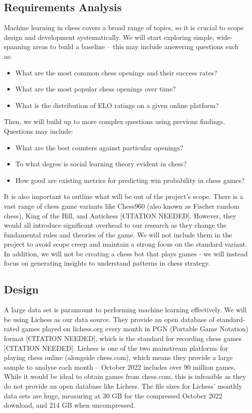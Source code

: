 \documentclass[%
 superscriptaddress,
showpacs,preprintnumbers,
 amsmath,
 amssymb,
 aps,
 pra,
showkeys,
onecolumn,
notitlepage,
11pt,
tightenlines      %
]{revtex4-1}
\begin{document}
\subsection{Requirements Analysis}
Machine learning in chess covers a broad range of topics, so it is crucial to scope design and development systematically. We will start exploring simple, wide-spanning areas to build a baseline – this may include answering questions such as:

\begin{itemize}
    \item What are the most common chess openings and their success rates?
    \item What are the most popular chess openings over time?
    \item What is the distribution of ELO ratings on a given online platform?
\end{itemize}

Then, we will build up to more complex questions using previous findings. Questions may include:
\begin{itemize}
    \item What are the best counters against particular openings?
    \item To what degree is social learning theory evident in chess?
    \item How good are existing metrics for predicting win probability in chess games?
\end{itemize}

It is also important to outline what will be out of the project's scope. There is a vast range of chess game variants like Chess960 (also known as Fischer random chess), King of the Hill, and Antichess [CITATION NEEDED]. However, they would all introduce significant overhead to our research as they change the fundamental rules and theories of the game. We will not include them in the project to avoid scope creep and maintain a strong focus on the standard variant. In addition, we will not be creating a chess bot that plays games - we will instead focus on generating insights to understand patterns in chess strategy.

\subsection{Design}
A large data set is paramount to performing machine learning effectively. We will be using Lichess as our data source. They provide an open database of standard-rated games played on lichess.org every month in PGN (Portable Game Notation) format [CITATION NEEDED], which is the standard for recording chess games [CITATION NEEDED]. Lichess is one of the two mainstream platforms for playing chess online (alongside chess.com), which means they provide a large sample to analyse each month – October 2022 includes over 90 million games. While it would be ideal to obtain games from chess.com, this is infeasible as they do not provide an open database like Lichess. The file sizes for Lichess' monthly data sets are huge, measuring at 30 GB for the compressed October 2022 download, and 214 GB when uncompressed.
\end{document}
